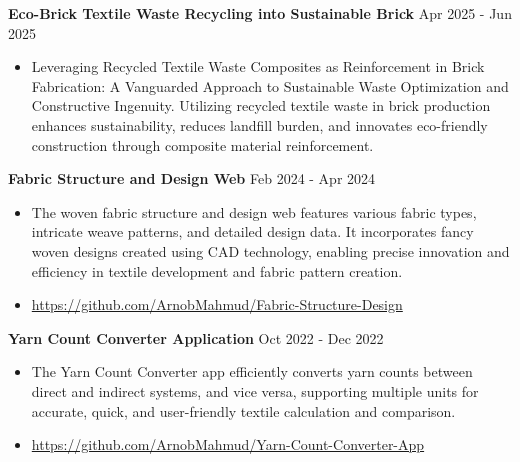 
\vspace{2mm}
{\textbf{Eco-Brick \textbar{} Textile Waste Recycling into Sustainable Brick}} \hfill Apr 2025 - Jun 2025\\

\begin{itemize}
\item 
\vspace{-2mm}
\begin{justify}Leveraging Recycled Textile Waste Composites as Reinforcement in Brick Fabrication: A Vanguarded Approach to Sustainable Waste Optimization and Constructive Ingenuity. Utilizing recycled textile waste in brick production enhances sustainability, reduces landfill burden, and innovates eco-friendly construction through composite material reinforcement.
\end{justify}
\end{itemize}

{\textbf{Fabric Structure and Design Web}} \hfill  Feb 2024 - Apr 2024\\
\begin{itemize}
\vspace{-2mm}
    \item 
    \begin{justify}The woven fabric structure and design web features various fabric types, intricate weave patterns, and detailed design data. It incorporates fancy woven designs created using CAD technology, enabling precise innovation and efficiency in textile development and fabric pattern creation.
    \end{justify}
\vspace{-2mm}
    \item \href{}{https://github.com/ArnobMahmud/Fabric-Structure-Design}
\end{itemize}

{\textbf{Yarn Count Converter Application}} \hfill Oct 2022 - Dec 2022\\
\begin{itemize}
\item  
\vspace{-2mm}
\begin{justify}The Yarn Count Converter app efficiently converts yarn counts between direct and indirect systems,
 and vice versa, supporting multiple units for accurate, quick, and user-friendly textile calculation and comparison.
 \end{justify}
 \item 
\vspace{-2mm} 
\href{}{https://github.com/ArnobMahmud/Yarn-Count-Converter-App}

\end{itemize}
\vspace{3mm}